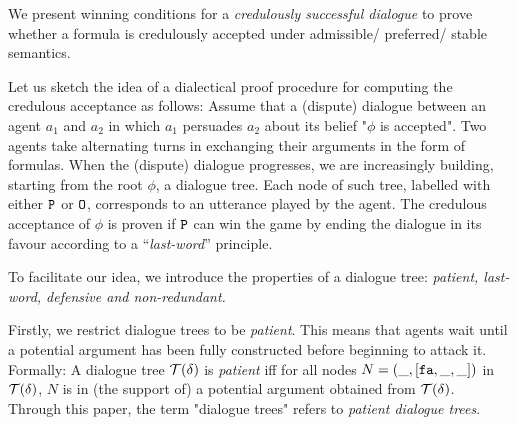 We present winning conditions for a \textit{credulously successful dialogue} to prove whether a formula is credulously accepted under admissible/ preferred/ stable semantics. 

Let us sketch the idea of a dialectical proof procedure for computing the credulous acceptance as follows:
Assume that a (dispute) dialogue between an agent $a_1$ and $a_2$ in which $a_1$ persuades $a_2$ about its belief "$\phi$ is accepted". Two agents take alternating turns in exchanging their arguments in the form of formulas. When the (dispute) dialogue progresses, we are increasingly building, starting from the root $\phi$, a dialogue tree. Each node of such tree, labelled with either $\texttt{\textup{P}}$ or $\texttt{\textup{O}}$, corresponds to an utterance played by the agent. The credulous acceptance of $\phi$ is proven if $\texttt{\textup{P}}$ can win the game by ending the dialogue in its favour according to a “\textit{last-word}” principle. 

To facilitate our idea, we introduce the properties of a dialogue tree:\textit{ patient, last-word, defensive and non-redundant.}



Firstly, we restrict dialogue trees to be \emph{patient}. This means that agents wait until a potential argument has been fully constructed before beginning to attack it. Formally: A dialogue tree $\mathcal{T}(\delta)$ is \emph{patient} iff for all nodes $N = (\_, [\texttt{\textup{fa}},\_,\_])$ in $\mathcal{T}(\delta)$, $N$ is in (the support of) a potential argument obtained from $\mathcal{T}(\delta)$.
Through this paper, the term "dialogue trees" refers to \emph{patient dialogue trees}.


